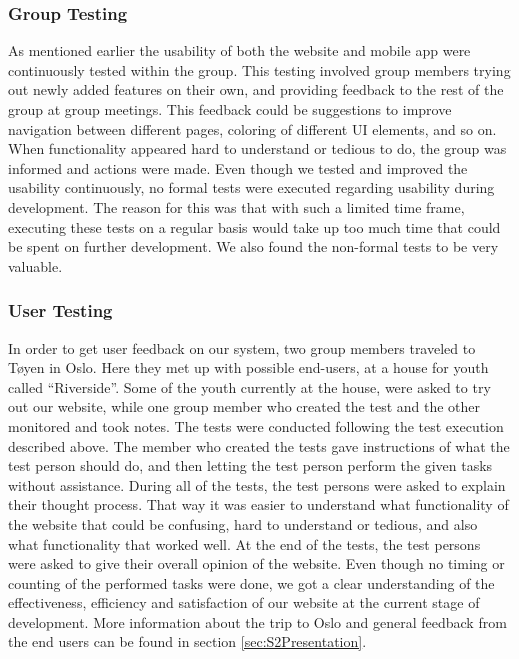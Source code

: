 \subsubsection{Group Testing}
As mentioned earlier the usability of both the website and mobile app were continuously tested within the group. This testing involved group members trying out newly added features on their own, and providing feedback to the rest of the group at group meetings. This feedback could be suggestions to improve navigation between different pages, coloring of different UI elements, and so on. When functionality appeared hard to understand or tedious to do, the group was informed and actions were made. Even though we tested and improved the usability continuously, no formal tests were executed regarding usability during development. The reason for this was that with such a limited time frame, executing these tests on a regular basis would take up too much time that could be spent on further development. We also found the non-formal tests to be very valuable.

\subsubsection{User Testing}
In order to get user feedback on our system, two group members traveled to T{\o}yen in Oslo. Here they met up with possible end-users, at a house for youth called “Riverside”. Some of the youth currently at the house, were asked to try out our website, while one group member who created the test and the other monitored and took notes. The tests were conducted following the test execution described above. The member who created the tests gave instructions of what the test person should do, and then letting the test person perform the given tasks without assistance. During all of the tests, the test persons were asked to explain their thought process. That way it was easier to understand what functionality of the website that could be confusing, hard to understand or tedious, and also what functionality that worked well. At the end of the tests, the test persons were asked to give their overall opinion of the website. Even though no timing or counting of the performed tasks were done, we got a clear understanding of the effectiveness, efficiency and satisfaction of our website at the current stage of development. More information about the trip to Oslo and general feedback from the end users can be found in section \ref{sec:S2Presentation}.
